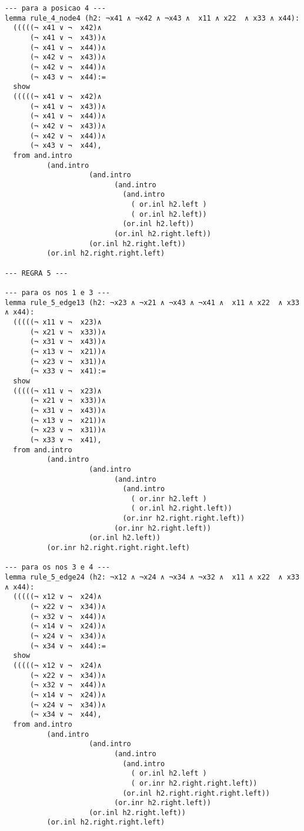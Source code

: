 \begin{enumerate}
\begin{lstlisting}
--- para a posicao 4 ---
lemma rule_4_node4 (h2: ¬x41 ∧ ¬x42 ∧ ¬x43 ∧  x11 ∧ x22  ∧ x33 ∧ x44):
  (((((¬ x41 ∨ ¬  x42)∧
      (¬ x41 ∨ ¬  x43))∧ 
      (¬ x41 ∨ ¬  x44))∧ 
      (¬ x42 ∨ ¬  x43))∧ 
      (¬ x42 ∨ ¬  x44))∧ 
      (¬ x43 ∨ ¬  x44):=
  show
  (((((¬ x41 ∨ ¬  x42)∧
      (¬ x41 ∨ ¬  x43))∧ 
      (¬ x41 ∨ ¬  x44))∧ 
      (¬ x42 ∨ ¬  x43))∧ 
      (¬ x42 ∨ ¬  x44))∧ 
      (¬ x43 ∨ ¬  x44),
  from and.intro
          (and.intro
                    (and.intro
                          (and.intro
                            (and.intro
                              ( or.inl h2.left ) 
                              ( or.inl h2.left))
                            (or.inl h2.left))
                          (or.inl h2.right.left))
                    (or.inl h2.right.left))
          (or.inl h2.right.right.left)

--- REGRA 5 ---

--- para os nos 1 e 3 ---
lemma rule_5_edge13 (h2: ¬x23 ∧ ¬x21 ∧ ¬x43 ∧ ¬x41 ∧  x11 ∧ x22  ∧ x33 ∧ x44):
  (((((¬ x11 ∨ ¬  x23)∧
      (¬ x21 ∨ ¬  x33))∧ 
      (¬ x31 ∨ ¬  x43))∧ 
      (¬ x13 ∨ ¬  x21))∧ 
      (¬ x23 ∨ ¬  x31))∧ 
      (¬ x33 ∨ ¬  x41):=
  show
  (((((¬ x11 ∨ ¬  x23)∧
      (¬ x21 ∨ ¬  x33))∧ 
      (¬ x31 ∨ ¬  x43))∧ 
      (¬ x13 ∨ ¬  x21))∧ 
      (¬ x23 ∨ ¬  x31))∧ 
      (¬ x33 ∨ ¬  x41),
  from and.intro
          (and.intro
                    (and.intro
                          (and.intro
                            (and.intro
                              ( or.inr h2.left ) 
                              ( or.inl h2.right.left))
                            (or.inr h2.right.right.left))
                          (or.inr h2.right.left))
                    (or.inl h2.left))
          (or.inr h2.right.right.right.left)

--- para os nos 3 e 4 ---
lemma rule_5_edge24 (h2: ¬x12 ∧ ¬x24 ∧ ¬x34 ∧ ¬x32 ∧  x11 ∧ x22  ∧ x33 ∧ x44):
  (((((¬ x12 ∨ ¬  x24)∧
      (¬ x22 ∨ ¬  x34))∧ 
      (¬ x32 ∨ ¬  x44))∧ 
      (¬ x14 ∨ ¬  x24))∧ 
      (¬ x24 ∨ ¬  x34))∧ 
      (¬ x34 ∨ ¬  x44):=
  show
  (((((¬ x12 ∨ ¬  x24)∧
      (¬ x22 ∨ ¬  x34))∧ 
      (¬ x32 ∨ ¬  x44))∧ 
      (¬ x14 ∨ ¬  x24))∧ 
      (¬ x24 ∨ ¬  x34))∧ 
      (¬ x34 ∨ ¬  x44),
  from and.intro
          (and.intro
                    (and.intro
                          (and.intro
                            (and.intro
                              ( or.inl h2.left ) 
                              ( or.inr h2.right.right.left))
                            (or.inl h2.right.right.right.left))
                          (or.inr h2.right.left))
                    (or.inl h2.right.left))
          (or.inl h2.right.right.left)
\end{lstlisting}

\end{enumerate}
